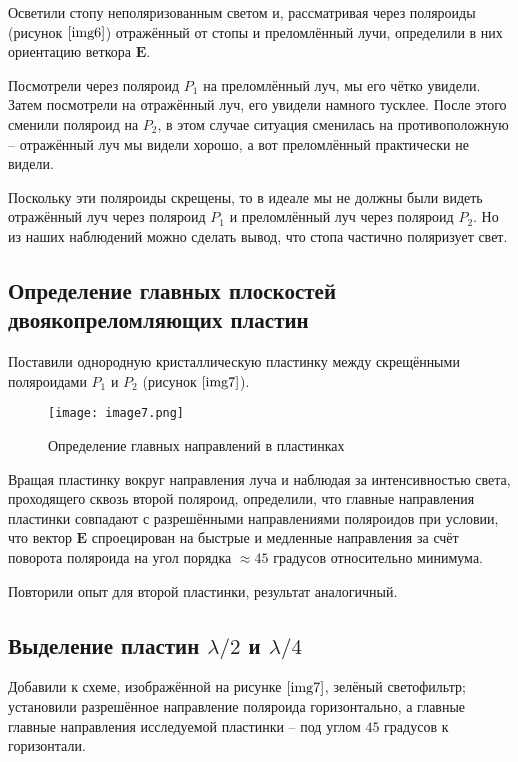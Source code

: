 \documentclass[a4paper,12pt]{article} %
\begin{document}
Осветили стопу неполяризованным светом и, рассматривая через поляроиды (рисунок $\ref{img6}$) отражённый от стопы и преломлённый лучи, определили в них ориентацию веткора $\mathbf{E}$.

Посмотрели через поляроид $P_1$ на преломлённый луч, мы его чётко увидели. Затем посмотрели на отражённый луч, его увидели намного тусклее. После этого сменили поляроид на $P_2$, в этом случае ситуация сменилась на противоположную -- отражённый луч мы видели хорошо, а вот преломлённый практически не видели. 

Поскольку эти поляроиды скрещены, то в идеале мы не должны были видеть отражённый луч через поляроид $P_1$ и преломлённый луч через поляроид $P_2$. Но из наших наблюдений можно сделать вывод, что стопа частично поляризует свет.

\subsection{Определение главных плоскостей двоякопреломляющих пластин}

Поставили однородную кристаллическую пластинку между скрещёнными поляроидами $P_1$ и $P_2$ (рисунок $\ref{img7}$).

\begin{wrapfigure}{r}{0.35\linewidth}
    \texttt{[image: image7.png]}
    \caption{Определение главных направлений в пластинках}
    \label{img7}
\end{wrapfigure}

Вращая пластинку вокруг направления луча и наблюдая за интенсивностью света, проходящего сквозь второй поляроид, определили, что главные направления пластинки совпадают с разрешёнными направлениями поляроидов при условии, что вектор $\mathbf{E}$ спроецирован на быстрые и медленные направления за счёт поворота поляроида на угол порядка $\approx45$ градусов относительно минимума.

Повторили опыт для второй пластинки, результат аналогичный.

\subsection{Выделение пластин $\lambda/2$ и $\lambda/4$}

Добавили к схеме, изображённой на рисунке $\ref{img7}$, зелёный светофильтр; установили разрешённое направление поляроида горизонтально, а главные главные направления исследуемой пластинки -- под углом $45$ градусов к горизонтали.
\end{document}
